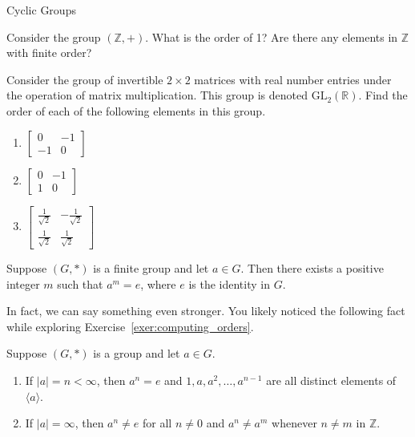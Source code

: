 \begin{section}{Cyclic Groups}
\begin{exercise}
Consider the group $(\mathbb{Z},+)$.  What is the order of 1?  Are there any elements in $\mathbb{Z}$ with finite order?
\end{exercise}

\begin{exercise}
Consider the group of invertible $2\times 2$ matrices with real number entries under the operation of matrix multiplication.  This group is denoted $\mathrm{GL}_2(\mathbb{R})$.  Find the order of each of the following elements in this group.
\begin{multicols}{3}
\begin{enumerate}[label=\rm{(\alph*)}]
\item $\begin{bmatrix} 0 & -1\\ -1 & 0\end{bmatrix}$
\item $\begin{bmatrix} 0 & -1\\ 1 & 0\end{bmatrix}$
\item $\begin{bmatrix} \frac{1}{\sqrt{2}} & -\frac{1}{\sqrt{2}}\\ \frac{1}{\sqrt{2}} & \frac{1}{\sqrt{2}}\end{bmatrix}$
\end{enumerate}
\end{multicols}
\end{exercise}

\begin{theorem}
Suppose $(G,*)$ is a finite group and let $a\in G$.  Then there exists a positive integer $m$ such that $a^m=e$, where $e$ is the identity in $G$. 
\end{theorem}

In fact, we can say something even stronger.  You likely noticed the following fact while exploring Exercise~\ref{exer:computing_orders}.

\begin{theorem}
Suppose $(G,*)$ is a group and let $a\in G$.
\begin{enumerate}[label=\rm{(\alph*)}]
\item If $|a|=n<\infty$, then $a^n=e$ and $1,a,a^2,\ldots, a^{n-1}$ are all distinct elements of $\langle a\rangle$.
\item If $|a|=\infty$, then $a^n\neq e$ for all $n\neq 0$ and $a^n\neq a^m$ whenever $n\neq m$ in $\mathbb{Z}$.
\end{enumerate}
\end{theorem}


\end{section}
